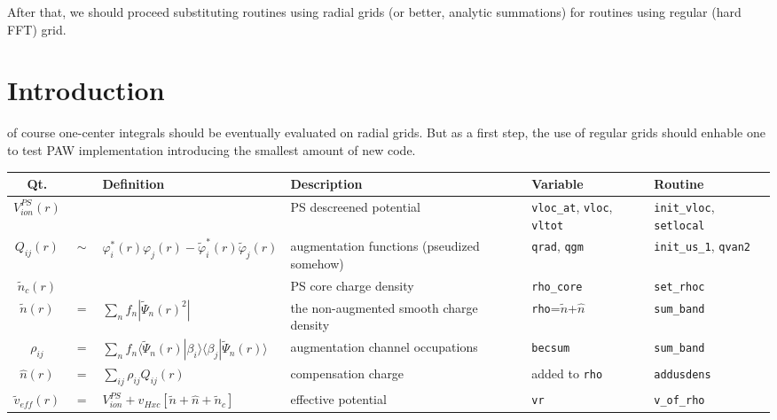 \documentclass[a4paper,twocolumn,12pt]{article}
\newcommand{\var}[1]{{\tt #1}}
\renewcommand{\phi}{\varphi}
\begin{document}
After that, we should proceed substituting routines using radial grids
(or better, analytic summations) for routines using regular (hard FFT)
grid.

\section*{Introduction}

 of course one-center integrals should be
eventually evaluated on radial grids.  But as a first step, the use of
regular grids should enhable one to test PAW implementation
introducing the smallest amount of new code.

\begin{table*}
\hspace{-1.2cm}
\begin{small}
\begin{tabular}{|c@{}c@{}l|p{4.5cm}|p{4.5cm}|p{4.0cm}|}
\hline
Qt. & & Definition & Description & Variable & Routine \\
\hline
%
%
\hline $V^{PS}_{ion}(r)$ &&& PS descreened potential & \var{vloc\_at}, \var{vloc}, \var{vltot} & \var{init\_vloc}, \var{setlocal} \\
%
$Q_{ij}(r)$ &$\sim$& $\phi^*_i(r)\phi_j(r)-\tilde{\phi}^*_i(r)\tilde{\phi}_j(r)$ & augmentation functions (pseudized somehow) & \var{qrad}, \var{qgm} & \var{init\_us\_1}, \var{qvan2} \\
%
$\tilde{n}_c(r)$ && & PS core charge density & \var{rho\_core} & \var{set\_rhoc}\\
%
\hline
%
$\tilde{n}(r)$ &$=$& $\sum_n f_n |\tilde{\Psi}_n(r)^2|$ &the
non-augmented smooth charge density&\var{rho}=$\tilde{n}$+$\hat{n}$&\var{sum\_band}\\
%
$\rho_{ij}$ &$=$& $\sum_n f_n
\langle\tilde{\Psi}_n(r)|\beta_i\rangle\langle\beta_j|\tilde{\Psi}_n(r)\rangle$
& augmentation channel occupations & \var{becsum} &\var{sum\_band} \\
%
$\hat{n}(r)$ &$=$& $\sum_{ij}\rho_{ij}Q_{ij}(r)$ & compensation
charge & added to \var{rho} & \var{addusdens} \\
%
$\tilde{v}_{eff}(r)$ &$=$& $V^{PS}_{ion}+v_{Hxc}[\tilde{n}+\hat{n}+\tilde{n}_c]$ & effective potential &\var{vr} & \var{v\_of\_rho} \\
%
\hline

\end{tabular}
\end{small}
\end{table*}
\end{document}

